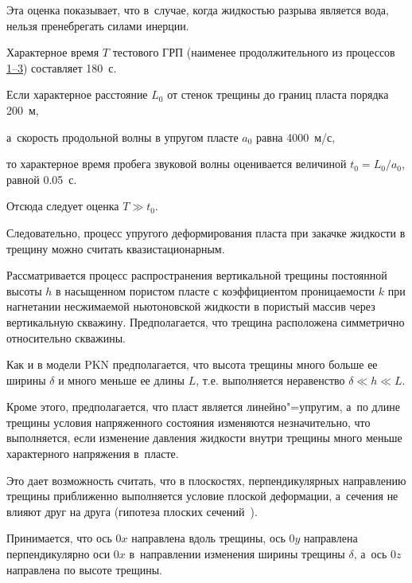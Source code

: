 Эта оценка показывает, что в~случае, когда жидкостью разрыва является вода, нельзя пренебрегать силами инерции.

	

Характерное время $T$ тестового ГРП (наименее продолжительного из процессов \hyperlink{bulg:proc}{1--3}) составляет 180~с. 

Если характерное расстояние $L_0$ от стенок трещины до границ пласта порядка 200~м, 

а~скорость продольной волны в упругом пласте $a_0$ равна 4000~м/с, 

то характерное время пробега звуковой волны оценивается величиной $t_0 = L_0/a_0$, равной 0.05~с. 

Отсюда следует оценка $T \gg t_0$. 

Следовательно, процесс упругого деформирования пласта при закачке жидкости в трещину можно считать квазистационарным.



\smallskip




Рассматривается процесс распространения вертикальной трещины постоянной высоты $h$ в насыщенном пористом пласте с коэффициентом проницаемости $k$ при нагнетании несжимаемой ньютоновской жидкости в пористый массив через вертикальную скважину. Предполагается, что трещина расположена симметрично относительно скважины.



Как и в модели PKN предполагается, что высота трещины много больше ее ширины $\delta$ и много меньше ее длины $L$, т.е. выполняется неравенство $\delta \ll  h \ll L$. 

Кроме этого, предполагается, что пласт является линейно"=упругим, а~по длине трещины условия напряженного состояния изменяются незначительно, что выполняется, если изменение давления жидкости внутри трещины много меньше характерного напряжения в~пласте. 

Это дает возможность считать, что в плоскостях, перпендикулярных направлению трещины приближенно выполняется условие плоской деформации, а~сечения не влияют друг на друга (гипотеза плоских сечений~\cite{Perkins_Kern, Nordgren1}).



Принимается, что ось $0x$ направлена вдоль трещины, ось $0y$ направлена перпендикулярно оси $0x$ в~направлении изменения ширины трещины $\delta$, а~ось $0z$ направлена по высоте трещины. 

